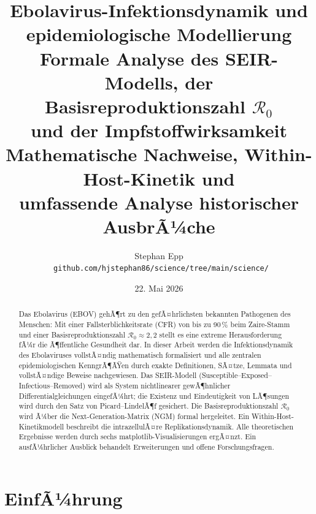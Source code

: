 ﻿\documentclass[12pt,a4paper]{article}
\theoremstyle{definition}
\theoremstyle{plain}
\theoremstyle{remark}
\begin{document}
\title{\textbf{Ebolavirus-Infektionsdynamik und epidemiologische Modellierung}\\[6pt]
\large Formale Analyse des SEIR-Modells, der Basisreproduktionszahl $\mathcal{R}_0$\\
und der Impfstoffwirksamkeit\\[8pt]
\normalsize Mathematische Nachweise, Within-Host-Kinetik und\\
umfassende Analyse historischer AusbrÃ¼che}
\author{Stephan Epp\\[4pt]
\
\small \texttt{github.com/hjstephan86/science/tree/main/science/}}
\date{22. Mai 2026}
\maketitle

\begin{abstract}
Das Ebolavirus (EBOV) gehÃ¶rt zu den gefÃ¤hrlichsten bekannten Pathogenen des Menschen:
Mit einer Fallsterblichkeitsrate (CFR) von bis zu 90\,\% beim Zaire-Stamm und
einer Basisreproduktionszahl $\mathcal{R}_0 \approx 2{,}2$ stellt es eine extreme
Herausforderung fÃ¼r die Ã¶ffentliche Gesundheit dar. In dieser Arbeit werden die
Infektionsdynamik des Ebolaviruses vollstÃ¤ndig mathematisch formalisiert und alle
zentralen epidemiologischen KenngrÃ¶ÃŸen durch exakte Definitionen, SÃ¤tze, Lemmata
und vollstÃ¤ndige Beweise nachgewiesen. Das SEIR-Modell (Susceptible--Exposed--Infectious--Removed)
wird als System nichtlinearer gewÃ¶hnlicher Differentialgleichungen eingefÃ¼hrt; die
Existenz und Eindeutigkeit von LÃ¶sungen wird durch den Satz von Picard--LindelÃ¶f
gesichert. Die Basisreproduktionszahl $\mathcal{R}_0$ wird Ã¼ber die Next-Generation-Matrix
(NGM) formal hergeleitet. Ein Within-Host-Kinetikmodell beschreibt die intrazellulÃ¤re
Replikationsdynamik. Alle theoretischen Ergebnisse werden durch sechs matplotlib-Visualisierungen
ergÃ¤nzt. Ein ausfÃ¼hrlicher Ausblick behandelt Erweiterungen und offene Forschungsfragen.
\end{abstract}

\tableofcontents
\newpage

\section{EinfÃ¼hrung}
\end{document}
